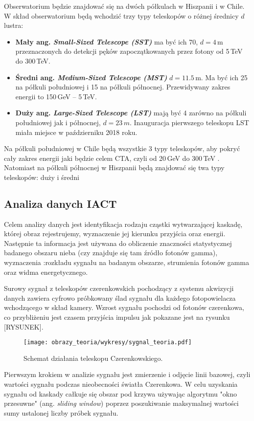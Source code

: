 \documentclass[a4paper,11pt,twoside]{article}
\begin{document}
Obserwatorium będzie znajdować się na dwóch półkulach w Hiszpanii i w Chile. W skład obserwatorium będą wchodzić trzy typy teleskopów o różnej średnicy $d$ lustra:
\begin{itemize}
\item {\bf{Mały} ang. \textsl{Small-Sized Telescope (SST)}} ma być ich 70, $d = 4$\,m przeznaczonych do detekcji pęków zapoczątkowanych przez fotony od 5\,TeV do 300\,TeV.
\item {\bf{Średni} ang. \textsl{Medium-Sized Telescope (MST)}} $d = 11.5$\,m. Ma być ich 25 na półkuli południowej i 15 na półkuli północnej. Przewidywany zakres energii to 150\,GeV -- 5\,TeV.
\item {\bf{Duży} ang. \textsl{Large-Sized Telescope (LST)}} mają być 4 zarówno na półkuli południowej jak i północnej, $d = 23\,m$. Inauguracja pierwszego teleskopu LST miała miejsce w październiku 2018 roku. 
\end{itemize}
Na półkuli południowej w Chile będą wszystkie 3 typy teleskopów,
 aby pokryć cały zakres energii jaki będzie celem CTA, czyli od 20\,GeV do 300\,TeV \cite{cta_web}. Natomiast na półkuli północnej w Hiszpanii będą znajdować się twa typy teleskopów: duży i średni  

\subsection{Analiza danych IACT}
Celem analizy danych jest identyfikacja rodzaju cząstki wytwarzającej  kaskadę, której obraz rejestrujemy, wyznaczenie jej kierunku przyjścia oraz energii. Następnie ta informacja jest używana do obliczenie znaczności statystycznej badanego obszaru nieba (czy znajduje się tam źródło fotonów gamma), wyznaczenia :rozkładu sygnału na badanym obszarze, strumienia fotonów gamma oraz widma energetycznego. 

Surowy sygnał z teleskopów czerenkowskich pochodzący z systemu akwizycji danych zawiera cyfrowo próbkowany ślad sygnału dla każdego fotopowielacza wchodzącego w skład kamery. Wzrost sygnału pochodzi od fotonów czerenkowa, co przybliżeniu jest czasem przyjścia impulsu jak pokazane jest na rysunku [RYSUNEK].

\begin{figure}[H] 
\centering
\texttt{[image: obrazy\_teoria/wykresy/sygnal\_teoria.pdf]}
\caption{Schemat działania teleskopu Czerenkowskiego.}
\label{fig:kamera}
\end{figure}

Pierwszym krokiem w analizie sygnału jest zmierzenie i odjęcie linii bazowej, czyli wartości sygnału podczas nieobecności światła Czerenkowa. W celu uzyskania sygnału od kaskady całkuje się obszar pod krzywa używając algorytmu "okno przesuwne" (ang. \textsl{sliding window}) poprzez poszukiwanie maksymalnej wartości sumy ustalonej liczby próbek sygnału.
\end{document}
